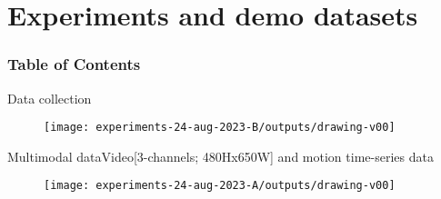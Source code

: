 
\section{Experiments and demo datasets}

\begin{frame}
      \frametitle{Table of Contents}
      \tableofcontents[currentsection]
\end{frame}


{

\begin{frame}{Data collection}
      \begin{figure}
        \centering
        \texttt{[image: experiments-24-aug-2023-B/outputs/drawing-v00]}
      \end{figure}
\end{frame}
}

{

\begin{frame}{Multimodal data}{Video[3-channels; 480Hx650W] and motion time-series data}
      \begin{figure}
        \centering
        \texttt{[image: experiments-24-aug-2023-A/outputs/drawing-v00]}
      \end{figure}
\end{frame}
}


